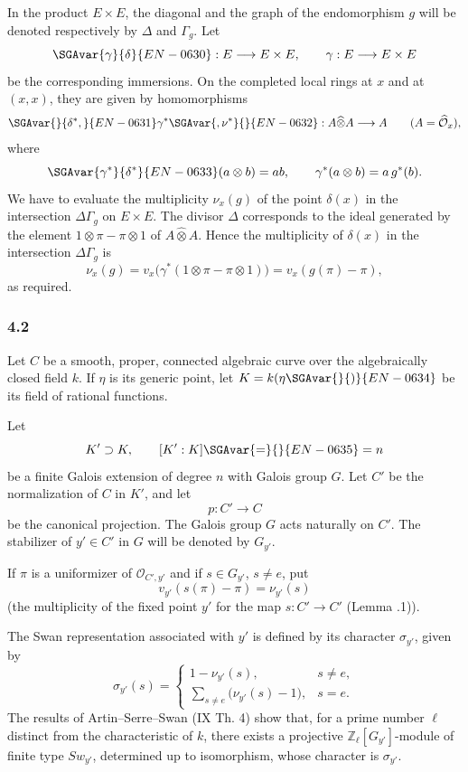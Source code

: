 In the product $E\times E$, the diagonal and the graph of the endomorphism $g$ will be denoted respectively by $\Delta$ and $\Gamma_g$. Let
\[
\SGAvar{\gamma}{\delta}{EN-0630}:E\longrightarrow E\times E,\qquad
\gamma:E\longrightarrow E\times E
\]
be the corresponding immersions. On the completed local rings at $x$ and at $(x,x)$, they are given by homomorphisms
\[
\SGAvar{}{\delta^*,}{EN-0631}\gamma^*\SGAvar{,\nu^*}{}{EN-0632}:A\widehat\otimes A\longrightarrow A
\qquad (A=\widehat{\mathcal O}_x),
\]
where
\[
\SGAvar{\gamma^*}{\delta^*}{EN-0633}(a\otimes b)=ab,\qquad
\gamma^*(a\otimes b)=a\,g^*(b).
\]
We have to evaluate the multiplicity $\nu_x(g)$ of the point $\delta(x)$ in the intersection $\Delta\Gamma_g$ on $E\times E$. The divisor $\Delta$ corresponds to the ideal generated by the element $1\otimes\pi-\pi\otimes1$ of $A\widehat\otimes A$. Hence the multiplicity of $\delta(x)$ in the intersection $\Delta\Gamma_g$ is
\[
\nu_x(g)=v_x\bigl(\gamma^*(1\otimes\pi-\pi\otimes1)\bigr)
      =v_x(g(\pi)-\pi),
\]
as required.

\subsubsection*{4.2}

Let $C$ be a smooth, proper, connected algebraic curve over the algebraically closed field $k$. If $\eta$ is its generic point, let $K=k(\eta\SGAvar{}{)}{EN-0634}$ be its field of rational functions.

Let
\[
K'\supset K,\qquad [K':K]\SGAvar{=}{}{EN-0635}=n
\]
be a finite Galois extension of degree $n$ with Galois group $G$. Let $C'$ be the normalization of $C$ in $K'$, and let
\[
p:C'\longrightarrow C
\]
be the canonical projection. The Galois group $G$ acts naturally on $C'$. The stabilizer of $y'\in C'$ in $G$ will be denoted by $G_{y'}$.

If $\pi$ is a uniformizer of $\mathcal O_{C',y'}$ and if $s\in G_{y'}$, $s\ne e$, put
\[
v_{y'}(s(\pi)-\pi)=\nu_{y'}(s)
\tag{4.2.1}
\]
(the multiplicity of the fixed point $y'$ for the map $s:C'\to C'$ (Lemma .1)).

The Swan representation associated with $y'$ is defined by its character $\sigma_{y'}$, given by
\[
\sigma_{y'}(s)=
\begin{cases}
1-\nu_{y'}(s),& s\ne e,\\[0.4em]
\displaystyle\sum_{s\ne e}\bigl(\nu_{y'}(s)-1\bigr),& s=e.
\end{cases}
\tag{4.2.2}
\]
The results of Artin--Serre--Swan (IX Th. 4) show that, for a prime number $\ell$ distinct from the characteristic of $k$, there exists a projective $\mathbb Z_\ell[G_{y'}]$-module of finite type $Sw_{y'}$, determined up to isomorphism, whose character is $\sigma_{y'}$.

